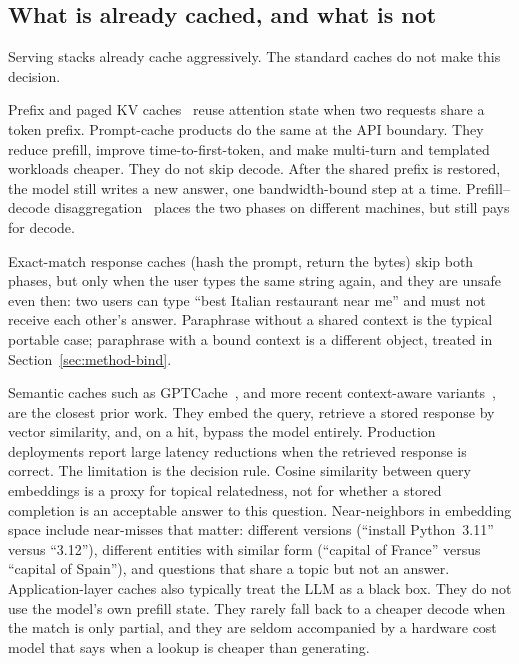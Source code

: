 \subsection{What is already cached, and what is not}
\label{sec:intro-prior}

Serving stacks already cache aggressively. The standard caches do not make this decision.

Prefix and paged KV caches~\citep{kwon2023efficient} reuse attention state when two requests share a token prefix. Prompt-cache products do the same at the API boundary. They reduce prefill, improve time-to-first-token, and make multi-turn and templated workloads cheaper. They do not skip decode. After the shared prefix is restored, the model still writes a new answer, one bandwidth-bound step at a time. Prefill--decode disaggregation~\citep{zhong2024distserve} places the two phases on different machines, but still pays for decode.

Exact-match response caches (hash the prompt, return the bytes) skip both phases, but only when the user types the same string again, and they are unsafe even then: two users can type ``best Italian restaurant near me'' and must not receive each other's answer. Paraphrase without a shared context is the typical portable case; paraphrase with a bound context is a different object, treated in Section~\ref{sec:method-bind}.

Semantic caches such as GPTCache~\citep{bang2023gptcache}, and more recent context-aware variants~\citep{yan2025contextcache,zhang2025smartcache}, are the closest prior work. They embed the query, retrieve a stored response by vector similarity, and, on a hit, bypass the model entirely. Production deployments report large latency reductions when the retrieved response is correct. The limitation is the decision rule. Cosine similarity between query embeddings is a proxy for topical relatedness, not for whether a stored completion is an acceptable answer to this question. Near-neighbors in embedding space include near-misses that matter: different versions (``install Python~3.11'' versus ``3.12''), different entities with similar form (``capital of France'' versus ``capital of Spain''), and questions that share a topic but not an answer. Application-layer caches also typically treat the LLM as a black box. They do not use the model's own prefill state. They rarely fall back to a cheaper decode when the match is only partial, and they are seldom accompanied by a hardware cost model that says when a lookup is cheaper than generating.

